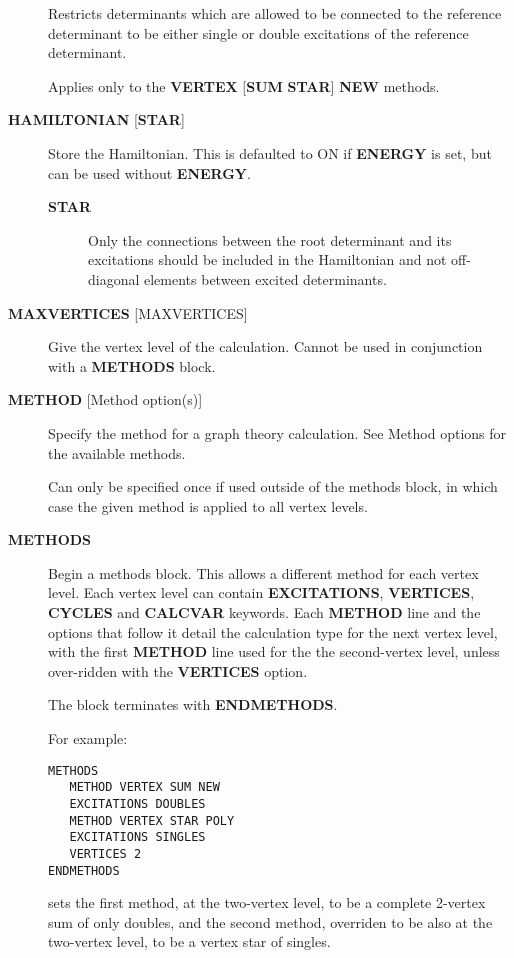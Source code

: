 \documentclass[openany,a4paper,10pt]{manual}
\begin{document}
\begin{description}
Restricts determinants which are allowed to be connected to the
reference determinant to be either single or double excitations of
the reference determinant.

Applies only to the \textbf{VERTEX} {[}\textbf{SUM} \textbf{STAR}{]} \textbf{NEW} methods.

\item[\textbf{HAMILTONIAN} {[}\textbf{STAR}{]}]
Store the Hamiltonian.  This is defaulted to ON if \textbf{ENERGY} is set,
but can be used without \textbf{ENERGY}.
\begin{description}
\item[\textbf{STAR}]
Only the connections between the root determinant and its
excitations should be included in the Hamiltonian and not
off-diagonal elements between excited determinants.

\end{description}

\item[\textbf{MAXVERTICES} {[}MAXVERTICES{]}]
Give the vertex level of the calculation.  Cannot be used in
conjunction with a \textbf{METHODS} block.

\item[\textbf{METHOD} {[}Method option(s){]}]
Specify the method for a graph theory calculation.  See Method
options for the available methods.

Can only be specified once if used outside of the methods block,
in which case the given method is applied to all vertex levels.

\item[\textbf{METHODS}]
Begin a methods block.  This allows a different method for each vertex
level.  Each vertex level can contain \textbf{EXCITATIONS}, \textbf{VERTICES},
\textbf{CYCLES} and \textbf{CALCVAR} keywords.
Each \textbf{METHOD} line and the options that follow it detail the calculation
type for the next vertex level, with the first \textbf{METHOD} line used for the
the second-vertex level, unless over-ridden with the \textbf{VERTICES} option.

The block terminates with \textbf{ENDMETHODS}.

For example:

\begin{Verbatim}[commandchars=@\[\]]
METHODS
   METHOD VERTEX SUM NEW
   EXCITATIONS DOUBLES
   METHOD VERTEX STAR POLY
   EXCITATIONS SINGLES
   VERTICES 2
ENDMETHODS
\end{Verbatim}

sets the first method, at the two-vertex level, to be a complete 2-vertex
sum of only doubles, and the second method, overriden to be also at
the two-vertex level, to be a vertex star of singles.


\end{description}
\end{document}
